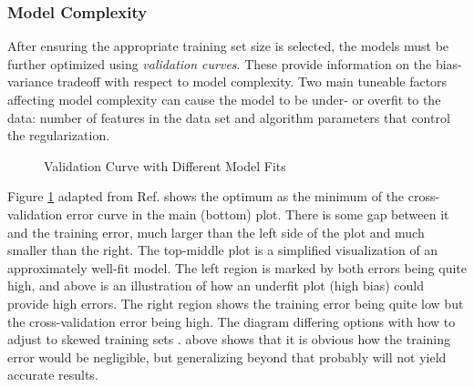 \subsubsection{Model Complexity}

After ensuring the appropriate training set size is selected, the models must
be further optimized using \textit{validation curves}.  These provide
information on the bias-variance tradeoff with respect to model complexity. Two
main tuneable factors affecting model complexity can cause the model to be
under- or overfit to the data: number of features in the data set and algorithm
parameters that control the regularization.

\begin{figure}[!htb]
  \centering
  \caption{Validation Curve with Different Model Fits}
  \label{fig:validation}
\end{figure}

Figure \ref{fig:validation} adapted from Ref. \cite{elements_stats} shows the
optimum as the minimum of the cross-validation error curve in the main (bottom)
plot. There is some gap between it and the training error, much larger than the
left side of the plot and much smaller than the right.  The top-middle plot is
a simplified visualization of an approximately well-fit model.  The left region
is marked by both errors being quite high, and above is an  illustration of how
an underfit plot (high bias) could provide high errors. The right region shows
the training error being quite low but the cross-validation error being high.
The diagram differing options with how to adjust to skewed training sets
\cite{scikit}.  above shows that it is obvious how the training error would be
negligible, but generalizing beyond that probably will not yield accurate
results. 

